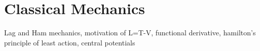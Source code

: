 \section{Classical Mechanics}
Lag and Ham mechanics, motivation of L=T-V, functional derivative, hamilton's principle of least action, central potentials